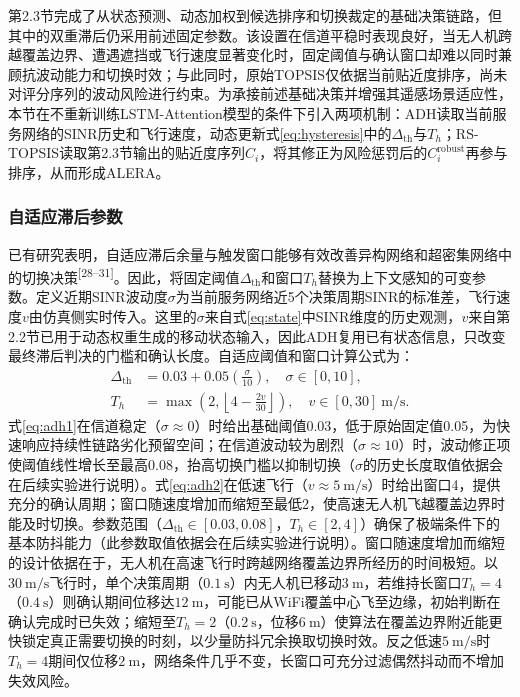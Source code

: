 \documentclass[10pt,a4paper]{ctexart}
\newcommand{\upcite}[1]{\textsuperscript{[#1]}}
\begin{document}
第2.3节完成了从状态预测、动态加权到候选排序和切换裁定的基础决策链路，但其中的双重滞后仍采用前述固定参数。该设置在信道平稳时表现良好，当无人机跨越覆盖边界、遭遇遮挡或飞行速度显著变化时，固定阈值与确认窗口却难以同时兼顾抗波动能力和切换时效；与此同时，原始TOPSIS仅依据当前贴近度排序，尚未对评分序列的波动风险进行约束。为承接前述基础决策并增强其遥感场景适应性，本节在不重新训练LSTM-Attention模型的条件下引入两项机制：ADH读取当前服务网络的SINR历史和飞行速度，动态更新式\eqref{eq:hysteresis}中的$\Delta_{\mathrm{th}}$与$T_h$；RS-TOPSIS读取第2.3节输出的贴近度序列$C_i$，将其修正为风险惩罚后的$C_i^{\mathrm{robust}}$再参与排序，从而形成ALERA。

\subsubsection{自适应滞后参数}

已有研究表明，自适应滞后余量与触发窗口能够有效改善异构网络和超密集网络中的切换决策\upcite{28--31}。因此，将固定阈值$\Delta_{\mathrm{th}}$和窗口$T_h$替换为上下文感知的可变参数。定义近期SINR波动度$\sigma$为当前服务网络近5个决策周期SINR的标准差，飞行速度$v$由仿真侧实时传入。这里的$\sigma$来自式\eqref{eq:state}中SINR维度的历史观测，$v$来自第2.2节已用于动态权重生成的移动状态输入，因此ADH复用已有状态信息，只改变最终滞后判决的门槛和确认长度。自适应阈值和窗口计算公式为：
\begin{align}
\Delta_{\mathrm{th}} &= 0.03+0.05\left(\frac{\sigma}{10}\right),\quad \sigma\in[0,10], \label{eq:adh1}\\
T_h &= \max\left(2,\left\lfloor4-\frac{2v}{30}\right\rfloor\right),\quad v\in[0,30]~\mathrm{m/s}. \label{eq:adh2}
\end{align}
式\eqref{eq:adh1}在信道稳定（$\sigma\approx0$）时给出基础阈值0.03，低于原始固定值0.05，为快速响应持续性链路劣化预留空间；在信道波动较为剧烈（$\sigma\approx10$）时，波动修正项使阈值线性增长至最高0.08，抬高切换门槛以抑制切换（$\sigma$的历史长度取值依据会在后续实验进行说明）。式\eqref{eq:adh2}在低速飞行（$v\approx5~\mathrm{m/s}$）时给出窗口4，提供充分的确认周期；窗口随速度增加而缩短至最低2，使高速无人机飞越覆盖边界时能及时切换。参数范围（$\Delta_{\mathrm{th}}\in[0.03,0.08]$，$T_h\in[2,4]$）确保了极端条件下的基本防抖能力（此参数取值依据会在后续实验进行说明）。窗口随速度增加而缩短的设计依据在于，无人机在高速飞行时跨越网络覆盖边界所经历的时间极短。以$30~\mathrm{m/s}$飞行时，单个决策周期（$0.1~\mathrm{s}$）内无人机已移动$3~\mathrm{m}$，若维持长窗口$T_h=4$（$0.4~\mathrm{s}$）则确认期间位移达$12~\mathrm{m}$，可能已从WiFi覆盖中心飞至边缘，初始判断在确认完成时已失效；缩短至$T_h=2$（$0.2~\mathrm{s}$，位移$6~\mathrm{m}$）使算法在覆盖边界附近能更快锁定真正需要切换的时刻，以少量防抖冗余换取切换时效。反之低速$5~\mathrm{m/s}$时$T_h=4$期间仅位移$2~\mathrm{m}$，网络条件几乎不变，长窗口可充分过滤偶然抖动而不增加失效风险。
\end{document}
